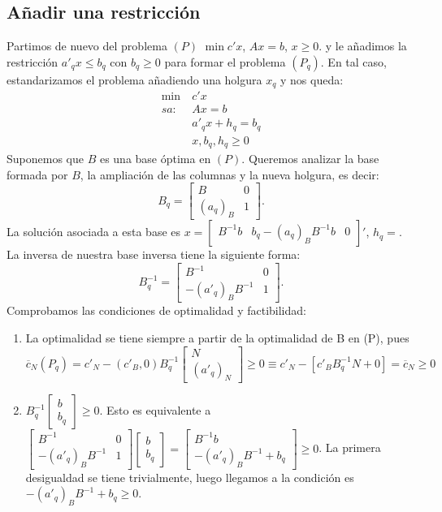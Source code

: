 \documentclass[PM.tex]{subfiles}
\begin{document}
\subsection{Añadir una restricción}
Partimos de nuevo del problema $(P)$ $\min c'x$, $Ax=b$, $x\geq 0$. y le añadimos la restricción $a'_q x\leq b_q$ con $b_q \geq 0$ para formar el problema $(P_q)$. En tal caso, estandarizamos el problema añadiendo una holgura $x_q$ y nos queda:
\begin{align*}
\min\ & c'x\\
sa:\  & Ax=b\\
& a'_q x+h_q= b_q\\
 & x, b_q, h_q\geq 0
\end{align*}
Suponemos que $B$ es una base óptima en $(P)$. Queremos analizar la base formada por $B$, la ampliación de las columnas y la nueva holgura, es decir:
\[ B_q=\begin{bmatrix}
B & 0\\
(a_q)_B & 1
\end{bmatrix}.\]
La solución asociada a esta base es $x=
\begin{bmatrix}
B^{-1}b & b_q-(a_q)_B B^{-1}b & 0\end{bmatrix}'$, $h_q=$. La inversa de nuestra base inversa tiene la siguiente forma:
\[ B_q^{-1}=\begin{bmatrix}
B^{-1} & 0\\
-(a'_q)_B B^{-1} & 1
\end{bmatrix}.\]
Comprobamos las condiciones de optimalidad y factibilidad:
\begin{enumerate}

\item La optimalidad se tiene siempre a partir de la optimalidad de B en (P), pues
\[\overline{c}_N(P_q)=c'_N-(c'_B,0)B_q^{-1}\begin{bmatrix}
N\\
(a'_q)_N
\end{bmatrix}\geq 0 \equiv c'_N-[c'_B B_q^{-1} N + 0]=\overline{c}_N\geq 0\]
\item $B_q^{-1}\begin{bmatrix}
b\\
b_q
\end{bmatrix}\geq 0$. Esto es equivalente a $\begin{bmatrix}
B^{-1} & 0\\
-(a'_q)_B B^{-1} & 1
\end{bmatrix}\begin{bmatrix}
b\\
b_q
\end{bmatrix}=\begin{bmatrix}
B^{-1}b\\
-(a'_q)_B B^{-1}+b_q
\end{bmatrix}\geq 0$. La primera desigualdad se tiene trivialmente, luego llegamos a la condición es $-(a'_q)_B B^{-1}+b_q\geq 0$.
\end{enumerate}
\end{document}
